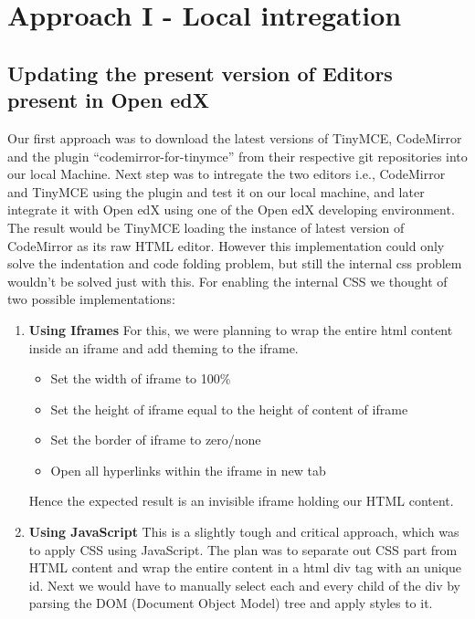 
\chapter{Approach I - Local intregation}
\section{Updating the present version of Editors present in Open edX}
Our first approach was to download the latest versions of TinyMCE, CodeMirror and
the plugin “codemirror-for-tinymce” from their respective git repositories into our local
Machine.\newline
Next step was to intregate the two editors i.e., CodeMirror and TinyMCE using the plugin and
test it on our local machine, and later integrate it with Open edX using one of the Open edX developing
environment.\newline
The result would be TinyMCE loading the instance of latest version of CodeMirror as its
raw HTML editor.
However this implementation could only solve the indentation and code folding problem,
but still the internal css problem wouldn’t be solved just with this.\newline\newline
For enabling the internal CSS we thought of two possible implementations:
\begin{enumerate}
\item\textbf{Using Iframes}\newline
For this, we were planning to wrap the entire html content inside an iframe
and add theming to the iframe.
\begin{itemize}
\item Set the width of iframe to 100\%
\item Set the height of iframe equal to the height of content of iframe
\item Set the border of iframe to zero/none
\item Open all hyperlinks within the iframe in new tab
\end{itemize}
Hence the expected result is an invisible iframe holding our HTML content.



\item\textbf{Using JavaScript}\newline
This is a slightly tough and critical approach, which was to apply CSS using
JavaScript. The plan was to separate out CSS part from HTML content and
wrap the entire content in a html div tag with an unique id.
Next we would have to manually select each and every child of the div by
parsing the DOM (Document Object Model) tree and apply styles to it.\newline
\end{enumerate}

